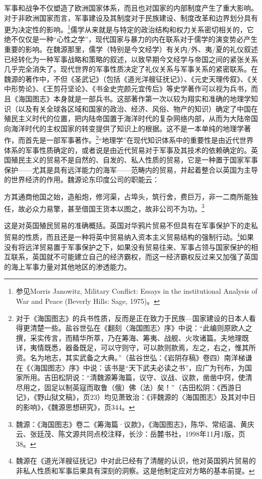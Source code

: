 \documentclass[a4paper, 12pt, openright]{ctexbook}
\renewenvironment{quote}
  {\list{}{\rightmargin2\ccwd \leftmargin2\ccwd \itemindent=2\ccwd \listparindent=2\ccwd}%
   \item\relax\small\kaishu\color{black}}
  {\endlist}
\begin{document}
军事和战争不仅塑造了欧洲国家体系，而且也对国家的内部制度产生了重大影响。对于非欧洲国家而言，军事建设及其制度对于民族建设、制度改革和边界划分具有更为决定性的影响。\footnote{参见Morris Janowitz, Military Conflict: Essays in the institutional Analysis of War and Peace (Beverly Hills: Sage, 1975)。}儒学从来就是与特定的政治结构和权力关系密切相关的，它绝不仅仅是一种“心性之学”，现代国家与暴力的内在联系对于儒学的演变势必产生重要的影响。在魏源那里，儒学（特别是今文经学）有关内/外、夷/夏的礼仪叙述已经转化为一种军事战略和策略的叙述，以致早期今文经学与帝国之间的紧张关系几乎完全消失了。现代世界的军事性质决定了礼仪关系与军事关系的紧密联系。在魏源的著作中，不但《圣武记》（包括《道光洋艘征抚记》）、《元史天理传叙》、《关中形势论》、《王剪苻坚论》、《书金史完颜元宜传后》等史学著作可以视为兵书，而且《海国图志》本身就是一部兵书。这部著作第一次以较为翔实和准确的地理学知识（以及有关全球各区域和国家的政治、经济、风俗、物产的知识）确定了中国在殖民主义时代的位置，把内陆帝国置于海洋时代的复杂网络内部，从而为大陆帝国向海洋时代的主权国家的转变提供了知识上的根据。这不是一本单纯的地理学著作，而首先是一部军事著作。\footnote{对于《海国图志》的兵书性质，反而是正在致力于民族—国家建设的日本人看得更清楚一些。盐谷世弘在《翻刻〈海国图志〉序》中说：“此编则原欧人之撰，采实传言，而精华所萃，乃在筹海、筹夷、战舰、火攻诸篇。夫地理既详，夷情既悉，器备既足，可以守则守，可以款则款焉，左之，右之，惟其所资。名为地志，其实武备之大典。”（盐谷世弘：《岩阴存稿》卷四）南洋梯谦在《〈海国图志〉序》中说：该书是“天下武夫必读之书”，应广为刊布，为国家所用。吉田松阴说：“清魏源筹海篇，议守、议战、议款，凿凿中窍，使清尽用之，固足以制英寇而取鲁（俄）佛（法）矣！”（吉田松阴：《西游日记》，《野山狱文稿》，页23）均见萧致治：《评魏源的〈海国图志〉及其对中日的影响》，《魏源思想研究》，页344。}“地理学”在现代知识体系中的重要性是由近代世界体系的军事性质确定的，或者说是由近代贸易对于军事及其技术的依赖确定的。英国殖民主义的贸易不是自然的、自发的、私人性质的贸易，它是一种置于国家军事保护——尤其是具有远洋能力的海军——范畴内的贸易，并起着整合以英国为主导的世界经济的作用。魏源论东印度公司的职能云：

\begin{quote}
方其通商他国之始，造船炮，修河渠，占埠头，筑行舍，费巨万，非一二商所能独任，故必众力易擎，甚至借国王货本以图之，故非公司不为功。\footnote{魏源：《海国图志》卷二《筹海篇·议款》，《海国图志》，陈华、常绍温、黄庆云、张廷茂、陈文源共同点校注释，长沙：岳麓书社，1998年11月1版，页38。}
\end{quote}

这是对英国殖民贸易的准确概括。英国对华鸦片贸易不但具有在军事保护下的走私贸易的性质，而且还是一种将英中贸易纳入资本主义贸易结构的强制行动。\footnote{魏源在《道光洋艘征抚记》中对此已经有了清醒的认识，他对英国鸦片贸易的非私人性质和军事后果具有深刻的洞察。这是他制定应对方略的基本前提。}如果没有将远洋贸易置于军事保护之下，如果没有贸易往来、军事占领与国家保护的相互联系，英国就不可能建立自己的经济霸权，而这一经济霸权反过来又加强了英国的海上军事力量对其他地区的渗透能力。
\end{document}
